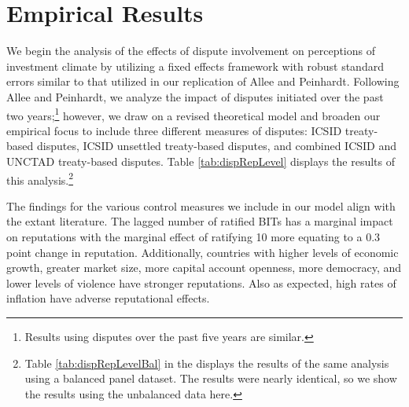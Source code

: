 \documentclass[12pt,onesided]{amsart}
\begin{document}
\section*{Empirical Results}

We begin the analysis of the effects of dispute involvement on perceptions of investment climate by utilizing a fixed effects framework with robust standard errors similar to that utilized in our replication of Allee and Peinhardt. Following Allee and Peinhardt, we analyze the impact of disputes initiated over the past two years;\footnote{Results using disputes over the past five years are similar.} however, we draw on a revised theoretical model and broaden our empirical focus to include three different measures of disputes: ICSID treaty-based disputes, ICSID unsettled treaty-based disputes, and combined ICSID and UNCTAD treaty-based disputes. Table \ref{tab:dispRepLevel} displays the results of this analysis.\footnote{Table \ref{tab:dispRepLevelBal} in the  displays the results of the same analysis using a balanced panel dataset. The results were nearly identical, so we show the results using the unbalanced data here.}

The findings for the various control measures we include in our model align with the extant literature. The lagged number of ratified BITs has a marginal impact on reputations with the marginal effect of ratifying 10 more equating to a 0.3 point change in reputation. Additionally, countries with higher levels of economic growth, greater market size, more capital account openness, more democracy, and lower levels of violence have stronger reputations. Also as expected, high rates of inflation have adverse reputational effects.

\end{document}
